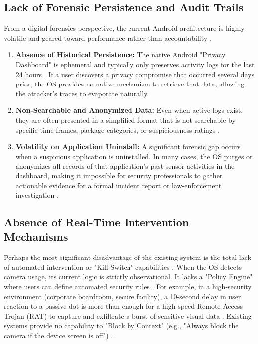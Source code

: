 \documentclass[12pt,a4paper]{report}
\begin{document}
\begin{enumerate}
    \subsection{Lack of Forensic Persistence and Audit Trails}
    From a digital forensics perspective, the current Android architecture is highly volatile and geared toward performance rather than accountability \cite{smarthome}.
    \begin{enumerate}
        \item \textbf{Absence of Historical Persistence:} The native Android "Privacy Dashboard" is ephemeral and typically only preserves activity logs for the last 24 hours \cite{privacydot}. If a user discovers a privacy compromise that occurred several days prior, the OS provides no native mechanism to retrieve that data, allowing the attacker's traces to evaporate naturally.
        \item \textbf{Non-Searchable and Anonymized Data:} Even when active logs exist, they are often presented in a simplified format that is not searchable by specific time-frames, package categories, or suspiciousness ratings \cite{smarthome}.
        \item \textbf{Volatility on Application Uninstall:} A significant forensic gap occurs when a suspicious application is uninstalled. In many cases, the OS purges or anonymizes all records of that application's past sensor activities in the dashboard, making it impossible for security professionals to gather actionable evidence for a formal incident report or law-enforcement investigation \cite{smarthome}.
    \end{enumerate}

    \subsection{Absence of Real-Time Intervention Mechanisms}
    Perhaps the most significant disadvantage of the existing system is the total lack of automated intervention or "Kill-Switch" capabilities \cite{snooperstop}. When the OS detects camera usage, its current logic is strictly observational. It lacks a "Policy Engine" where users can define automated security rules \cite{deepdroid}. For example, in a high-security environment (corporate boardroom, secure facility), a 10-second delay in user reaction to a passive dot is more than enough for a high-speed Remote Access Trojan (RAT) to capture and exfiltrate a burst of sensitive visual data \cite{checkmarx}. Existing systems provide no capability to "Block by Context" (e.g., "Always block the camera if the device screen is off") \cite{contextaware}.


\end{enumerate}
\end{document}
